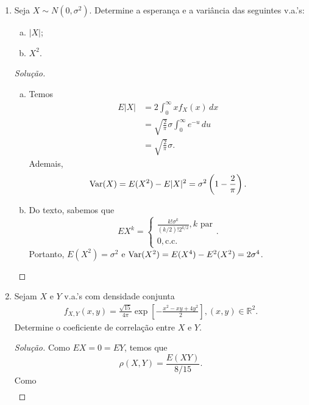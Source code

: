 \documentclass[../Notas.tex]{subfiles}
\begin{document}
\begin{enumerate}
\begin{proof}[Solução]
\begin{align*}
        \end{align*}
        Portanto, $\Var(X) = 1/2$.
    \end{proof}
    \item Seja $X\sim N(0, \sigma^2)$. Determine a esperança e a variância das seguintes v.a.’s:
    \begin{enumerate}[a)]
    \item $|X|$;
    \item $X^2$.
    \end{enumerate}
    \begin{proof}[Solução]
        \begin{enumerate}[a)]
            \item Temos
            \begin{align*}
                E|X| &= 2\int_0^{\infty} xf_X(x) \, dx \\
                     &= \sqrt{\frac{2}{\pi}}\sigma
                     \int_0^{\infty} e^{-u} \, du \\
                     &= \sqrt{\frac{2}{\pi}}\sigma.
            \end{align*}
            Ademais,
            \[
            \text{Var}(X) = E(X^2) - E|X|^2 = \sigma^2\left(1 - \frac{2}{\pi}\right).
            \]
            \item Do texto, sabemos que
            \[
            EX^k = \begin{cases}
            \frac{k!\sigma^k}{(k/2)!2^{k/2}}, k \text{ par} \\
            0, \text{c.c.}
            \end{cases}.
            \]
            Portanto, $E(X^2) = \sigma^2$ e $\text{Var}(X^2) = E(X^4) - E^2(X^2) = 2\sigma^4$.
        \end{enumerate}
    \end{proof}
    \item Sejam $X$ e $Y$ v.a.’s com densidade conjunta
    \begin{align*}
        f_{X,Y}(x,y) = \frac{\sqrt{15}}{4\pi}\exp[ -\frac{x^2 - xy + 4y^2}{2} ], (x,y)\in\mathbb{R}^2.
    \end{align*}
    Determine o coeficiente de correlação entre $X$ e $Y$.
    \begin{proof}[Solução]
        Como $EX = 0 = EY$, temos que
        \[
        \rho(X,Y) = \frac{E(XY)}{8/15}.
        \]
        Como
        \begin{align*}

\end{align*}
\end{proof}
\end{enumerate}
\end{document}
